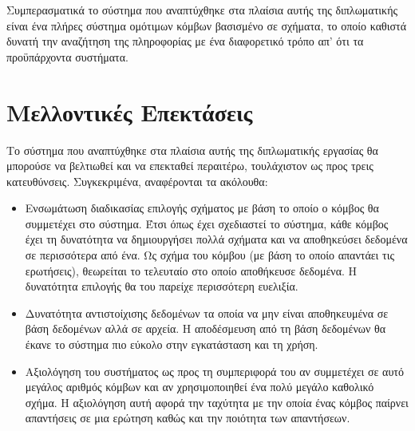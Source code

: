 Συμπερασματικά το σύστημα που αναπτύχθηκε στα πλαίσια αυτής της
διπλωματικής είναι ένα πλήρες σύστημα ομότιμων κόμβων βασισμένο σε
σχήματα, το οποίο καθιστά δυνατή την αναζήτηση της πληροφορίας με
ένα διαφορετικό τρόπο απ' ότι τα προϋπάρχοντα  συστήματα.

\section{Μελλοντικές Επεκτάσεις}
Το σύστημα που αναπτύχθηκε στα πλαίσια αυτής της διπλωματικής
εργασίας θα μπορούσε να βελτιωθεί και να επεκταθεί περαιτέρω,
τουλάχιστον ως προς τρεις κατευθύνσεις. Συγκεκριμένα, αναφέρονται
τα ακόλουθα:

\begin{itemize}
\item Ενσωμάτωση διαδικασίας επιλογής σχήματος με βάση το οποίο ο
κόμβος θα συμμετέχει στο σύστημα. Έτσι όπως έχει σχεδιαστεί το
σύστημα, κάθε κόμβος έχει τη δυνατότητα να δημιουργήσει πολλά
σχήματα και να αποθηκεύσει δεδομένα σε περισσότερα από ένα. Ως
σχήμα του κόμβου (με βάση το οποίο απαντάει τις ερωτήσεις),
θεωρείται το τελευταίο στο οποίο αποθήκευσε δεδομένα. Η δυνατότητα
επιλογής θα του παρείχε περισσότερη ευελιξία.
\item Δυνατότητα αντιστοίχισης δεδομένων τα οποία να μην είναι
αποθηκευμένα σε βάση δεδομένων αλλά σε αρχεία. Η αποδέσμευση από
τη βάση δεδομένων θα έκανε το σύστημα πιο εύκολο στην εγκατάσταση
και τη χρήση.
\item Αξιολόγηση του συστήματος ως προς τη συμπεριφορά του αν
συμμετέχει σε αυτό μεγάλος αριθμός κόμβων  και αν χρησιμοποιηθεί ένα πολύ μεγάλο καθολικό σχήμα. H
αξιολόγηση αυτή αφορά την ταχύτητα με την οποία ένας κόμβος
παίρνει απαντήσεις σε μια ερώτηση καθώς και την ποιότητα των
απαντήσεων.
\end{itemize}
